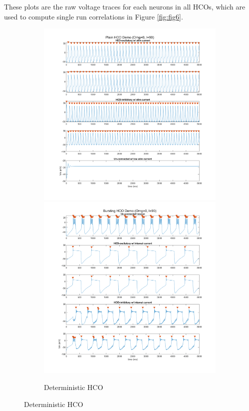 \documentclass[
]{article}
\begin{document}
These plots are the raw voltage traces for each neurons in all HCOs, which are used to compute single run correlations in Figure \ref{fig:fig6}.

\begin{figure}
  \centering
  \begin{subfigure}[b]{\textwidth}
    \includegraphics[width=.49\textwidth]{figs/old/Fx1_A_det_NB.png}
    \includegraphics[width=.49\textwidth]{figs/old/Fx1_A_HCO_det_B.png}
    \vspace{-0.5cm} \caption{Deterministic HCO}
  \end{subfigure}
\end{figure}
\end{document}
